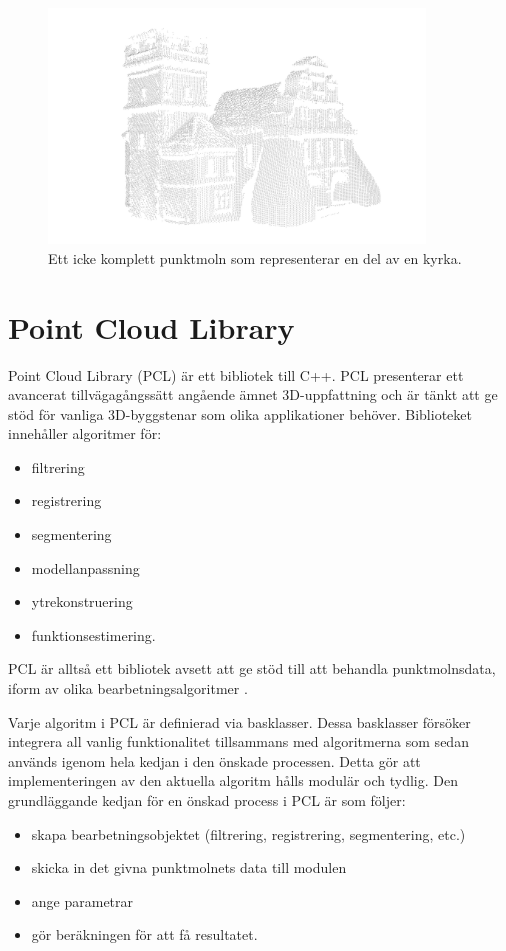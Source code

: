 \begin{figure}[H]
	\centering
	\includegraphics[width=100mm]{figures/icke_komplett_moln_kyrka.png}
	\caption{Ett icke komplett punktmoln som representerar en del av en kyrka.}
	\label{fig:point_cloud_church}
\end{figure}

\section{Point Cloud Library}
Point Cloud Library (PCL) är ett bibliotek till C++. PCL presenterar ett avancerat tillvägagångssätt angående ämnet 3D-uppfattning och är tänkt att ge stöd för vanliga 3D-byggstenar som olika applikationer behöver. Biblioteket innehåller algoritmer för:

\begin{itemize}
	\item filtrering
	\item registrering
	\item segmentering
	\item modellanpassning
	\item ytrekonstruering
	\item funktionsestimering.
\end{itemize}
PCL är alltså ett bibliotek avsett att ge stöd till att behandla punktmolnsdata, iform av olika bearbetningsalgoritmer \cite{rusu20113d}.

Varje algoritm i PCL är definierad via basklasser. Dessa basklasser försöker integrera all vanlig funktionalitet tillsammans med algoritmerna som sedan används igenom hela kedjan i den önskade processen. Detta gör att implementeringen av den aktuella algoritm hålls modulär och tydlig. Den grundläggande kedjan för en önskad process i PCL är som följer:

\begin{itemize}
	\item skapa bearbetningsobjektet (filtrering, registrering, segmentering, etc.)
	\item skicka in det givna punktmolnets data till modulen
	\item ange parametrar
	\item gör beräkningen för att få resultatet.
\end{itemize}

